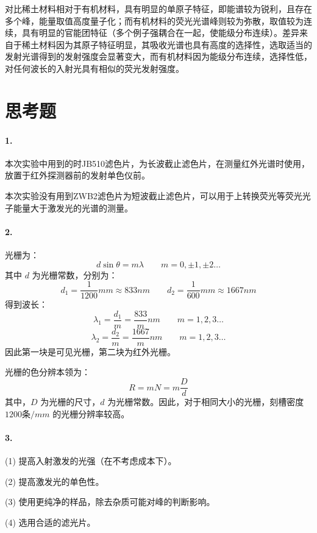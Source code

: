 \documentclass{article}
\begin{document}
	对比稀土材料相对于有机材料，具有明显的单原子特征，即能谱较为锐利，且存在多个峰，能量取值高度量子化；而有机材料的荧光光谱峰则较为弥散，取值较为连续，具有明显的官能团特征（多个例子强耦合在一起，使能级分布连续）。差异来自于稀土材料因为其原子特征明显，其吸收光谱也具有高度的选择性，选取适当的发射光谱得到的发射强度会显著变大，而有机材料因为能级分布连续，选择性低，对任何波长的入射光具有相似的荧光发射强度。
	
	
	
	\section{思考题}
	\paragraph{1.}
	
	本次实验中用到的时JB510滤色片，为长波截止滤色片，在测量红外光谱时使用，放置于红外探测器前的发射单色仪前。
	
	
	本次实验没有用到ZWB2滤色片为短波截止滤色片，可以用于上转换荧光等荧光光子能量大于激发光的光谱的测量。
	
	
	\paragraph{2.}
	
	光栅为：
	$$
	d \sin{\theta}= m \lambda \qquad m=0,\pm 1,\pm 2 \dots
	$$
	其中 $d$ 为光栅常数，分别为：
	$$
	d_1=\frac{1}{1200}mm \approx 833nm \qquad d_2=\frac{1}{600}mm \approx 1667nm
	$$
	得到波长：
	$$
	\lambda_1=\frac{d_1}{m} = \frac{833}{m} nm \qquad m=1,2,3 \dots 
	$$
	$$
	\lambda_2=\frac{d_2}{m} = \frac{1667}{m} nm \qquad m=1,2,3 \dots 
	$$
	因此第一块是可见光栅，第二块为红外光栅。
	
	光栅的色分辨本领为：
	$$
	R=mN=m\frac{D}{d}
	$$
	其中，$D$ 为光栅的尺寸，$d$ 为光栅常数。因此，对于相同大小的光栅，刻槽密度 $1200条/mm$ 的光栅分辨率较高。
	
	\paragraph{3.}
	
		(1)	提高入射激发的光强（在不考虑成本下）。
		
		
		(2)	提高激发光的单色性。
		
		
		(3)   使用更纯净的样品，除去杂质可能对峰的判断影响。
		
		
		(4)	选用合适的滤光片。
\end{document}

